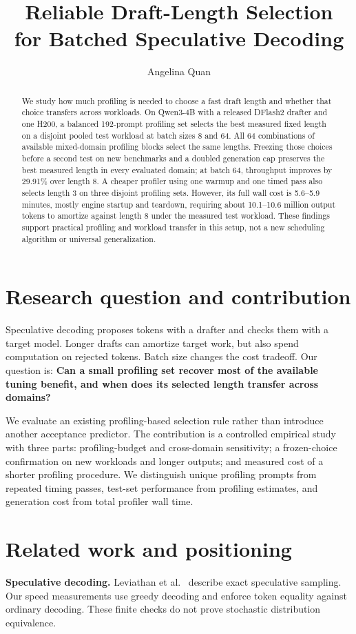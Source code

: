\documentclass[10pt]{article}
\title{Reliable Draft-Length Selection\\for Batched Speculative Decoding}
\author{Angelina Quan}\date{}
\begin{document}
\maketitle
\begin{abstract}
We study how much profiling is needed to choose a fast draft length and whether that choice transfers across workloads. On Qwen3-4B with a released DFlash2 drafter and one H200, a balanced 192-prompt profiling set selects the best measured fixed length on a disjoint pooled test workload at batch sizes 8 and 64. All 64 combinations of available mixed-domain profiling blocks select the same lengths. Freezing those choices before a second test on new benchmarks and a doubled generation cap preserves the best measured length in every evaluated domain; at batch 64, throughput improves by 29.91\% over length 8. A cheaper profiler using one warmup and one timed pass also selects length 3 on three disjoint profiling sets. However, its full wall cost is 5.6--5.9 minutes, mostly engine startup and teardown, requiring about 10.1--10.6 million output tokens to amortize against length 8 under the measured test workload. These findings support practical profiling and workload transfer in this setup, not a new scheduling algorithm or universal generalization.
\end{abstract}

\section{Research question and contribution}
Speculative decoding proposes tokens with a drafter and checks them with a target model. Longer drafts can amortize target work, but also spend computation on rejected tokens. Batch size changes the cost tradeoff. Our question is: \textbf{Can a small profiling set recover most of the available tuning benefit, and when does its selected length transfer across domains?}

We evaluate an existing profiling-based selection rule rather than introduce another acceptance predictor. The contribution is a controlled empirical study with three parts: profiling-budget and cross-domain sensitivity; a frozen-choice confirmation on new workloads and longer outputs; and measured cost of a shorter profiling procedure. We distinguish unique profiling prompts from repeated timing passes, test-set performance from profiling estimates, and generation cost from total profiler wall time.

\section{Related work and positioning}
\textbf{Speculative decoding.} Leviathan et al.~\cite{leviathan} describe exact speculative sampling. Our speed measurements use greedy decoding and enforce token equality against ordinary decoding. These finite checks do not prove stochastic distribution equivalence.
\end{document}
